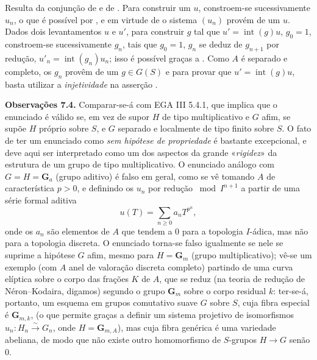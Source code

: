 Resulta da conjunção de
 e de
. Para construir
um \(u\), constroem-se sucessivamente \(u_n\), o que é
possível por , e
em virtude de 
o sistema \((u_n)\) provém de um \(u\). Dados dois
levantamentos \(u\) e \(u'\), para construir \(g\)
tal que \(u'=\operatorname{int}(g)u\), \(g_0=1\),
constroem-se sucessivamente \(g_n\), tais que \(g_0=1\),
\(g_n\) se deduz de \(g_{n+1}\) por redução,
\(u'_n=\operatorname{int}(g_n)u_n\); isso é possível
graças a . Como
\(A\) é separado e completo, os \(g_n\) provêm de um
\(g\in G(S)\) e para provar que \(u'=\operatorname{int}(g)u\),
basta utilizar a \emph{injetividade} na asserção
.

\medskip
\noindent{}\textbf{Observações 7.4.}
Comparar-se-á 
com EGA III 5.4.1, que implica que o enunciado
 é válido se,
em vez de supor \(H\) de tipo multiplicativo e \(G\)
afim, se supõe \(H\) próprio sobre \(S\), e \(G\)
separado e localmente de tipo finito sobre \(S\).
O fato de ter um enunciado como
 \emph{sem hipótese
de propriedade} é bastante excepcional, e deve aqui
ser interpretado como um dos aspectos da grande
«\emph{rigidez}» da estrutura de um grupo de tipo
multiplicativo. O enunciado análogo com
\(G=H=\mathbf G_a\) (grupo aditivo) é falso em geral,
como se vê tomando \(A\) de característica \(p>0\), e
definindo os \(u_n\) por redução \(\bmod I^{n+1}\) a
partir de uma série formal aditiva
\[
  u(T)=\sum_{n\geq0}a_nT^{p^n},
\]
onde os \(a_n\) são elementos de \(A\) que tendem a 0
para a topologia \(I\)-ádica, mas não para a topologia
discreta. O enunciado
 torna-se falso
igualmente se nele se suprime a hipótese \(G\) afim,
mesmo para \(H=\mathbf G_m\) (grupo multiplicativo);
vê-se um exemplo (com \(A\) anel de valoração discreta
completo) partindo de uma curva elíptica sobre o corpo
das frações \(K\) de \(A\), que se reduz (na teoria de
redução de Néron--Kodaira, digamos) segundo o grupo
\(\mathbf G_m\) sobre o corpo residual \(k\): ter-se-á,
portanto, um esquema em grupos comutativo suave \(G\)
sobre \(S\), cuja fibra especial é \(\mathbf G_{m,k}\),
(o que permite graças a
 definir um sistema
projetivo de isomorfismos
\(u_n:H_n\xrightarrow{\sim}G_n\), onde
\(H=\mathbf G_{m,A}\)), mas cuja fibra genérica é uma
variedade abeliana, de modo que não existe outro
homomorfismo de \(S\)-grupos \(H\to G\) senão 0.
